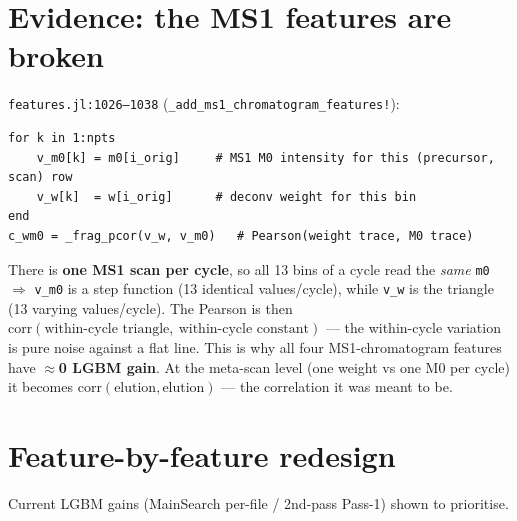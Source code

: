 \documentclass[11pt]{article}
\newcommand{\code}[1]{\texttt{\small #1}}
\begin{document}
\section{Evidence: the MS1 features are broken}

\code{features.jl:1026--1038} (\code{\_add\_ms1\_chromatogram\_features!}):
\begin{lstlisting}[firstnumber=1026]
for k in 1:npts
    v_m0[k] = m0[i_orig]     # MS1 M0 intensity for this (precursor, scan) row
    v_w[k]  = w[i_orig]      # deconv weight for this bin
end
c_wm0 = _frag_pcor(v_w, v_m0)   # Pearson(weight trace, M0 trace)
\end{lstlisting}
There is \textbf{one MS1 scan per cycle}, so all 13 bins of a cycle read the
\emph{same} \code{m0} $\Rightarrow$ \code{v\_m0} is a step function (13 identical
values/cycle), while \code{v\_w} is the triangle (13 varying values/cycle). The
Pearson is then $\mathrm{corr}(\text{within-cycle triangle},\ \text{within-cycle
constant})$ --- the within-cycle variation is pure noise against a flat line. This
is why all four MS1-chromatogram features have \textbf{$\approx$0 LGBM gain}. At the
meta-scan level (one weight vs one M0 per cycle) it becomes
$\mathrm{corr}(\text{elution},\text{elution})$ --- the correlation it was meant to be.

\section{Feature-by-feature redesign}

Current LGBM gains (MainSearch per-file / 2nd-pass Pass-1) shown to prioritise.
\end{document}
